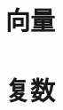 \documentclass[../main.tex]{subfiles}
\begin{document}
\begin{introduction}
    
\end{introduction}

\section{向量}

\section{复数}
\end{document}
